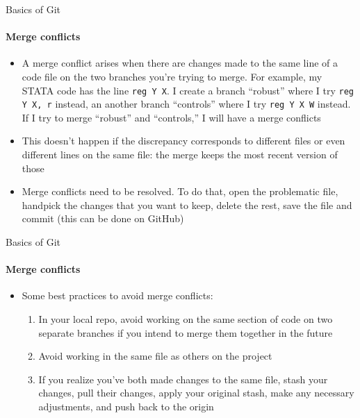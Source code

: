 \documentclass[10pt, aspectratio=169, xcolor=dvipsnames]{beamer}
\let\olditem\item
\renewcommand{\item}{%
\olditem\vspace{0.3em}}
\begin{document}
\begin{frame}[t]{Basics of Git}
    \framesubtitle{Merge conflicts}

    \normalsize\vspace{0.5em}
    \begin{itemize}
        \item A merge conflict arises when there are changes made to the same line of a code file on the two branches you're trying to merge. For example, my STATA code has the line \texttt{reg Y X}. I create a branch ``robust'' where I try \texttt{reg Y X, r} instead, an another branch ``controls'' where I try \texttt{reg Y X W} instead. If I try to merge ``robust'' and ``controls,'' I will have a merge conflicts
        \item This doesn't happen if the discrepancy corresponds to different files or even different lines on the same file: the merge keeps the most recent version of those
        \item Merge conflicts need to be resolved. To do that, open the problematic file, handpick the changes that you want to keep, delete the rest, save the file and commit (this can be done on GitHub)
    \end{itemize}
\end{frame}

\begin{frame}[t]{Basics of Git}
    \framesubtitle{Merge conflicts}

    \normalsize\vspace{0.5em}
    \begin{itemize}
        \item Some best practices to avoid merge conflicts: \begin{enumerate}
            \item In your local repo, avoid working on the same section of code on two separate branches if you intend to merge them together in the future
            \item Avoid working in the same file as others on the project
            \item If you realize you've both made changes to the same file, stash your changes, pull their changes, apply your original stash, make any necessary adjustments, and push back to the origin
        \end{enumerate}
    \end{itemize}
\end{frame}
\end{document}
